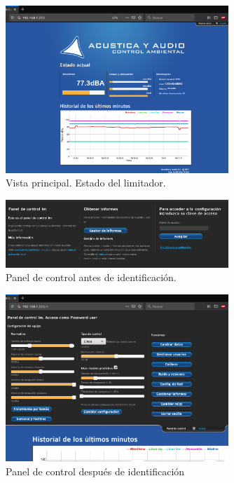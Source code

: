 \begin{figure}[ht]
    \centering
    \includegraphics[width=0.75\textwidth]{imagenes/interfaz/Interfaz_0.png}
    \caption{Vista principal. Estado del limitador.}
\end{figure}

\begin{figure}[ht]
    \centering
    \includegraphics[width=0.75\textwidth]{imagenes/interfaz/Interfaz_1_menu.png}
    \caption{Panel de control antes de identificación.}
\end{figure}

\begin{figure}[ht]
    \centering
    \includegraphics[width=0.75\textwidth]{imagenes/interfaz/Interfaz_2_menu_acceso.png}
    \caption{Panel de control después de identificación}
\end{figure}

